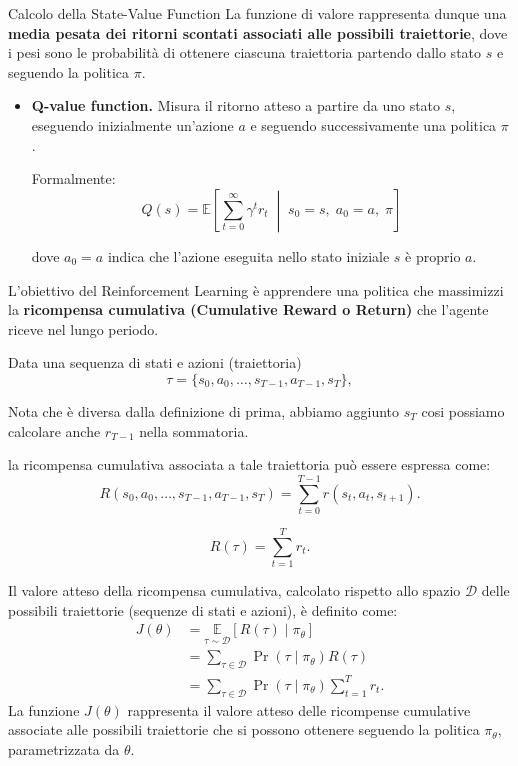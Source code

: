 \begin{itemize}
\begin{example}{Calcolo della State-Value Function}
    La funzione di valore rappresenta dunque una
    \textbf{media pesata dei ritorni scontati associati alle
    possibili traiettorie}, dove i pesi sono le probabilità
    di ottenere ciascuna traiettoria partendo dallo stato
    $s$ e seguendo la politica $\pi$.
\end{example}
    \begin{itemize}
    \item \textbf{Q-value function.}
    Misura il ritorno atteso a partire da uno stato $s$,
    eseguendo inizialmente un'azione $a$ e seguendo
    successivamente una politica $\pi$.

    Formalmente:
    \[
    Q(s)
    =
    \mathbb{E}\left[
        \sum_{t=0}^{\infty}\gamma^t r_t
        \;\middle|\;
        s_0=s,\;a_0=a,\;\pi
    \right]
    \]

    dove $a_0=a$ indica che l'azione eseguita
    nello stato iniziale $s$ è proprio $a$.
\end{itemize}
\end{itemize}

\newpage

L'obiettivo del Reinforcement Learning è apprendere una politica
che massimizzi la \textbf{ricompensa cumulativa (Cumulative Reward
o Return)} che l'agente riceve nel lungo periodo.

Data una sequenza di stati e azioni (traiettoria)
\[
    \tau = \{s_0,a_0,\ldots,s_{T-1},a_{T-1},s_T\},
\]
\begin{warning}{}
    Nota che è diversa dalla definizione di prima, abbiamo aggiunto $s_T$ cosi 
    possiamo calcolare anche $r_{T-1}$ nella sommatoria.
\end{warning}
la ricompensa cumulativa associata a tale traiettoria può essere
espressa come:
\[
    R(s_0,a_0,\ldots,s_{T-1},a_{T-1},s_T)=\sum_{t=0}^{T-1}r(s_t,a_t,s_{t+1}).
\]

\[
    R(\tau)=\sum_{t=1}^{T}r_t.
\]

Il valore atteso della ricompensa cumulativa, calcolato
rispetto allo spazio $\mathcal{D}$ delle possibili traiettorie
(sequenze di stati e azioni), è definito come:
\begin{align*}
    J(\theta)
    &= \underset{\tau\sim\mathcal{D}}{\mathbb{E}}
    \left[R(\tau)\mid\pi_\theta\right] \\
    &= \sum_{\tau\in\mathcal{D}}
    \Pr(\tau \mid \pi_\theta )R(\tau) \\
    &= \sum_{\tau\in\mathcal{D}}
    \Pr(\tau \mid \pi_\theta)\sum_{t=1}^{T}r_t.
\end{align*}
La funzione $J(\theta)$ rappresenta il valore atteso delle 
ricompense cumulative associate alle possibili traiettorie 
che si possono ottenere seguendo la politica $\pi_\theta$, 
parametrizzata da $\theta$.

